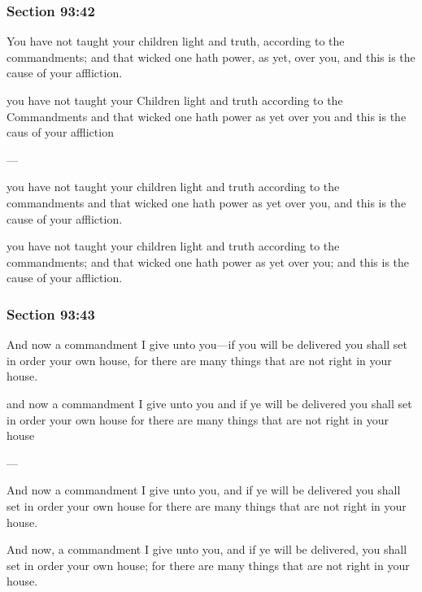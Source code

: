 	\subsubsection{Section 93:42} %
		\label{DC93-42}

		You have not taught your children light and truth, according to the commandments; and that wicked one hath power, as yet, over you, and this is the cause of your affliction.

		\begin{framed}
		\scriptsize
			\begin{compactdesc}
				\item[JSP] you have not taught your Children light and truth according to the Commandments and that wicked one hath power as yet over you and this is the caus of your affliction
				\item[BC] ---
				\item[RB2] you have not taught your children light and truth according to the commandments and that wicked one hath power as yet over you, and this is the cause of your affliction. 
				\item[RB1] you have not taught your children light and truth according to the commandments; and that wicked one hath power as yet over you; and this is the cause of your affliction. 
			\end{compactdesc}
		\end{framed}

	\subsubsection{Section 93:43} %
		\label{DC93-43}

		And now a commandment I give unto you---if you will be delivered you shall set in order your own house, for there are many things that are not right in your house.

		\begin{framed}
		\scriptsize
			\begin{compactdesc}
				\item[JSP] and now a commandment I give unto you and if ye will be delivered you shall set in order your own house for there are many things that are not right in your house
				\item[BC] ---
				\item[RB2] And now a commandment I give unto you, and if ye will be delivered you shall set in order your own house for there are many things that are not right in your house. 
				\item[RB1] And now, a commandment I give unto you, and if ye will be delivered, you shall set in order your own house; for there are many things that are not right in your house. 
			\end{compactdesc}
		\end{framed}

